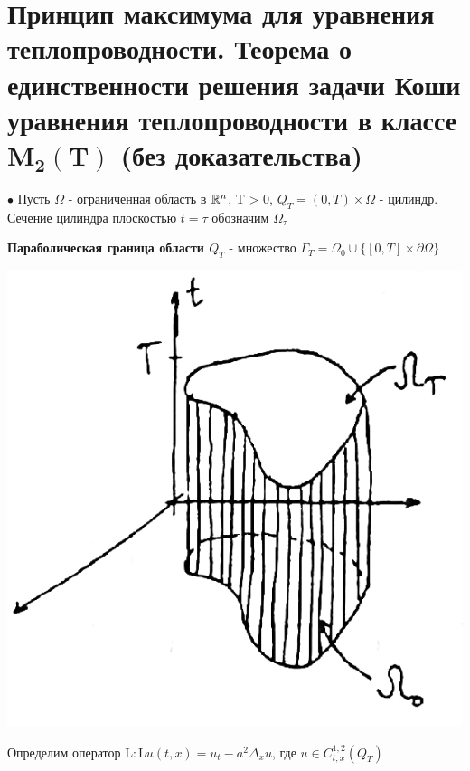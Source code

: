

\section{Принцип максимума для уравнения теплопроводности. Теорема о единственности решения задачи Коши уравнения теплопроводности в классе $\mathbf{M_2(T)}$ (без доказательства) }
$\bullet$ Пусть $\Omega$ - ограниченная область в $\mathbb{R}^n$, T > 0, 
$Q_T = (0,T) \times \Omega$ - цилиндр. Сечение цилиндра плоскостью $t = \tau$ обозначим $\Omega_\tau$

\begin{definition}
{\bf Параболическая граница области $Q_T$} - множество $\Gamma_T = \Omega_0 \cup \{[0,T] \times \partial{\Omega} \}$
\end{definition}
\begin{center}
\includegraphics[scale=0.5]{11_1_new}
\end{center}

Определим оператор $\mathrm{L} : \mathrm{L}u(t,x) = u_t - a^2 \Delta_xu$, где 
$u \in C_{t, x}^{1,2}(Q_T)$

